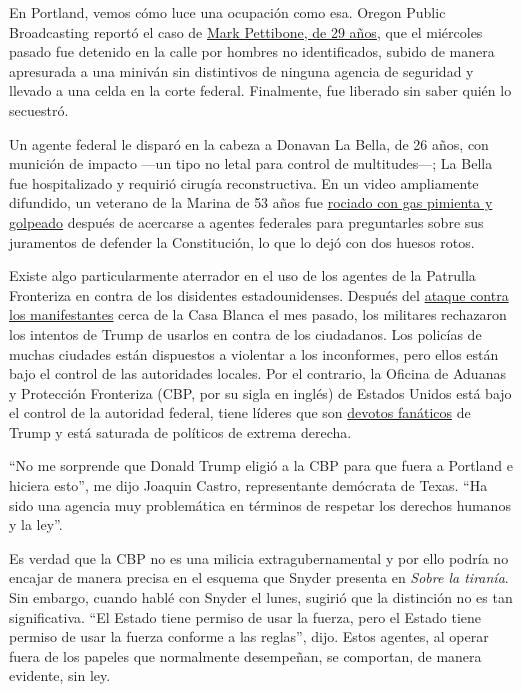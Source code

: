 En Portland, vemos cómo luce una ocupación como esa. Oregon Public
Broadcasting reportó el caso de
\href{https://www.opb.org/news/article/federal-law-enforcement-unmarked-vehicles-portland-protesters/}{Mark
Pettibone, de 29 años}, que el miércoles pasado fue detenido en la calle
por hombres no identificados, subido de manera apresurada a una miniván
sin distintivos de ninguna agencia de seguridad y llevado a una celda en
la corte federal. Finalmente, fue liberado sin saber quién lo secuestró.

Un agente federal le disparó en la cabeza a Donavan La Bella, de 26
años, con munición de impacto ---un tipo no letal para control de
multitudes---; La Bella fue hospitalizado y requirió cirugía
reconstructiva. En un video ampliamente difundido, un veterano de la
Marina de 53 años fue
\href{https://www.washingtonpost.com/nation/2020/07/20/christopher-david-portland-protest-video/}{rociado
con gas pimienta y golpeado} después de acercarse a agentes federales
para preguntarles sobre sus juramentos de defender la Constitución, lo
que lo dejó con dos huesos rotos.

Existe algo particularmente aterrador en el uso de los agentes de la
Patrulla Fronteriza en contra de los disidentes estadounidenses. Después
del
\href{https://www.nytimes3xbfgragh.onion/es/2020/06/03/espanol/mundo/trump-foto-iglesia-protestas.html}{ataque
contra los manifestantes} cerca de la Casa Blanca el mes pasado, los
militares rechazaron los intentos de Trump de usarlos en contra de los
ciudadanos. Los policías de muchas ciudades están dispuestos a violentar
a los inconformes, pero ellos están bajo el control de las autoridades
locales. Por el contrario, la Oficina de Aduanas y Protección Fronteriza
(CBP, por su sigla en inglés) de Estados Unidos está bajo el control de
la autoridad federal, tiene líderes que son
\href{https://www.newyorker.com/news/news-desk/the-border-patrol-was-primed-for-president-trump}{devotos
fanáticos} de Trump y está saturada de políticos de extrema derecha.

``No me sorprende que Donald Trump eligió a la CBP para que fuera a
Portland e hiciera esto'', me dijo Joaquin Castro, representante
demócrata de Texas. ``Ha sido una agencia muy problemática en términos
de respetar los derechos humanos y la ley''.

Es verdad que la CBP no es una milicia extragubernamental y por ello
podría no encajar de manera precisa en el esquema que Snyder presenta en
\emph{Sobre la tiranía}. Sin embargo, cuando hablé con Snyder el lunes,
sugirió que la distinción no es tan significativa. ``El Estado tiene
permiso de usar la fuerza, pero el Estado tiene permiso de usar la
fuerza conforme a las reglas'', dijo. Estos agentes, al operar fuera de
los papeles que normalmente desempeñan, se comportan, de manera
evidente, sin ley.

